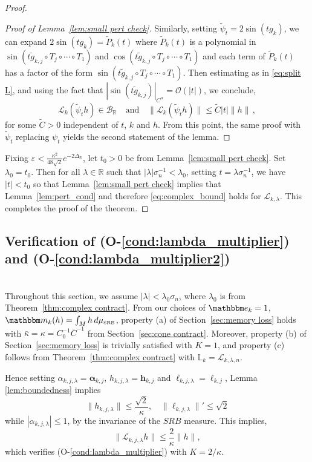 \documentclass{amsart}
\numberwithin{equation}{section}
\newcommand\cB{{\mathcal B}}
\newcommand\cL{{\mathcal L}}
\newcommand\bL{{\mathbb L}}
\newcommand\bR{{\mathbb R}}
\newcommand\ve{\varepsilon}
\newcommand{\bbe}{\mathbbm e}
\newcommand{\bbm}{\mathbbm m}
\newcommand{\musrb}{\mu_{\mbox{\tiny SRB}}}
\begin{document}
\begin{proof}
\begin{proof}[Proof of Lemma~\ref{lem:small pert check}]
Similarly, setting $\tilde \psi_t = 2 \sin(t g_k)$, we can expand $2 \sin(t g_k) = \tilde P_k(t)$ where $\tilde P_k(t)$
is a polynomial in $\sin(t \tilde g_{k,j} \circ T_j \circ \cdots \circ T_1)$ and $\cos(t \tilde g_{k,j} \circ T_j \circ \cdots \circ T_1)$ and each term of $\tilde P_k(t)$ has a factor of the form $\sin(t \tilde g_{k,j} \circ T_j \circ \cdots \circ T_1)$.
Then estimating as in \eqref{eq:split L}, and using the fact that $| \sin (t \tilde g_{k,j}) |_{C^\alpha} = \mathcal{O}(|t|)$,
we conclude,
\[
\cL_k(\tilde \psi_t h) \in \cB_{\bR} \quad \mbox{and} \quad \| \cL_k(\tilde \psi_t h) \| \le \tilde C |t| \|h \| \, ,
\]
for some $\tilde C>0$ independent of $t$, $k$ and $h$.  From this point, the same proof with $\tilde \psi_t$ replacing
$\psi_t$ yields the second statement of the lemma. 
\end{proof}
Fixing $\ve < \frac{\kappa^2}{48 \sqrt{2}} e^{-2 \Delta_{\bR}}$, let $t_0>0$ be from Lemma~\ref{lem:small pert check}.
Set $\lambda_0 = t_0$.  Then for all $\lambda \in \mathbb{R}$ such that
$|\lambda| \sigma_n^{-1} < \lambda_0$, setting $t = \lambda \sigma_n^{-1}$, we have $|t| < t_0$ so that Lemma~\ref{lem:small pert check} implies that
Lemma~\ref{lem:pert_cond} and therefore \eqref{eq:complex_bound} holds for $\cL_{k, \lambda}$.
This completes the proof of the theorem.
\end{proof}


\subsection{Verification of (O-\ref{cond:lambda_multiplier}) and (O-\ref{cond:lambda_multiplier2})}\ \\
\label{sec:check O3}
Throughout this section, we assume $|\lambda| < \lambda_0 \sigma_n$, where $\lambda_0$ is from Theorem~\ref{thm:complex contract}.
From our choices of $\bbe_k = 1$, $\bbm_k(h) = \int_M h \, d\musrb$, property (a)
of Section~\ref{sec:memory loss} holds with $\bar\kappa = \kappa = C_0^{-1}\bar C^{-1}$ from
Section~\ref{sec:cone contract}.  Moreover, property (b) of Section~\ref{sec:memory loss} is trivially
satisfied with $K=1$, and property (c)
follows from Theorem~\ref{thm:complex contract} with $\bL_k = \cL_{k, \lambda, n}$.

 Hence setting $\alpha_{k,j,\lambda} = \boldsymbol{\alpha}_{k,j}$, $h_{k,j,\lambda} = \boldsymbol{h}_{k,j}$ and $\ell_{k,j,\lambda} = \boldsymbol{\ell}_{k,j}$,
 Lemma \ref{lem:boundedness} implies
\[
\|h_{k,j,\lambda}\|\leq \frac{\sqrt 2}{\kappa},\quad \|\ell_{k,j,\lambda}\|'\leq \sqrt 2
\]
while $|\alpha_{k,j,\lambda}| \le 1$, by the invariance of the $SRB$ measure. This implies,
\[
\| \cL_{k,j,\lambda} h \| \le  \frac{2}{\kappa} \| h \|,
\]
which verifies (O-\ref{cond:lambda_multiplier}) with $K = 2/\kappa$.
\end{document}
